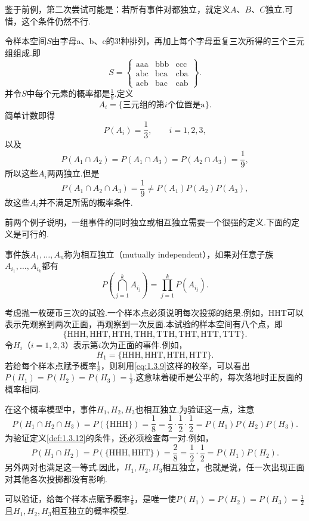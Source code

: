 鉴于前例，第二次尝试可能是：若所有事件对都独立，就定义$A$、$B$、$C$独立.可惜，这个条件仍然不行.
\begin{example}[字母]\label{ex:1.3.11}
令样本空间$S$由字母a、b、c的$3!$种排列，再加上每个字母重复三次所得的三个三元组组成.即
$$S=\left\{\begin{array}{ccc}\mathrm{aaa}&\mathrm{bbb}&\mathrm{ccc}\\\mathrm{abc}&\mathrm{bca}&\mathrm{cba}\\\mathrm{acb}&\mathrm{bac}&\mathrm{cab}\end{array}\right\}.$$
并令$S$中每个元素的概率都是$\frac19$.定义
$$A_i=\{\text{三元组的第$i$个位置是a}\}.$$
简单计数即得
$$P(A_i)=\frac13,\qquad i=1,2,3,$$
以及
$$P(A_1\cap A_2)=P(A_1\cap A_3)=P(A_2\cap A_3)=\frac19,$$
所以这些$A_i$两两独立.但是
$$P(A_1\cap A_2\cap A_3)=\frac19\ne P(A_1)P(A_2)P(A_3),$$
故这些$A_i$并不满足所需的概率条件.
\end{example}

前两个例子说明，一组事件的同时独立或相互独立需要一个很强的定义.下面的定义是可行的.


\begin{definition}\label{def:1.3.12}
事件族$A_1,\ldots,A_n$称为相互独立（mutually independent），如果对任意子族$A_{i_1},\ldots,A_{i_k}$都有
$$P\left(\bigcap_{j=1}^k A_{i_j}\right)=\prod_{j=1}^k P(A_{i_j}).$$
\end{definition}

\begin{example}[抛硬币三次——I]\label{ex:1.3.13}
考虑抛一枚硬币三次的试验.一个样本点必须说明每次投掷的结果.例如，HHT可以表示先观察到两次正面，再观察到一次反面.本试验的样本空间有八个点，即
$$\{\mathrm{HHH,HHT,HTH,THH,TTH,THT,HTT,TTT}\}.$$
令$H_i$（$i=1,2,3$）表示第$i$次为正面的事件.例如，
\begin{equation}\label{eq:1.3.9}H_1=\{\mathrm{HHH,HHT,HTH,HTT}\}.\end{equation}
若给每个样本点赋予概率$\frac18$，则利用\eqref{eq:1.3.9}这样的枚举，可以看出$P(H_1)=P(H_2)=P(H_3)=\frac12$.这意味着硬币是公平的，每次落地时正反面的概率相同.

在这个概率模型中，事件$H_1,H_2,H_3$也相互独立.为验证这一点，注意
$$P(H_1\cap H_2\cap H_3)=P(\{\mathrm{HHH}\})=\frac18=\frac12\cdot\frac12\cdot\frac12=P(H_1)P(H_2)P(H_3).$$
为验证定义\ref{def:1.3.12}的条件，还必须检查每一对.例如，
$$P(H_1\cap H_2)=P(\{\mathrm{HHH,HHT}\})=\frac28=\frac12\cdot\frac12=P(H_1)P(H_2).$$
另外两对也满足这一等式.因此，$H_1,H_2,H_3$相互独立，也就是说，任一次出现正面对其他各次投掷都没有影响.

可以验证，给每个样本点赋予概率$\frac18$，是唯一使$P(H_1)=P(H_2)=P(H_3)=\frac12$且$H_1,H_2,H_3$相互独立的概率模型.
\end{example}

